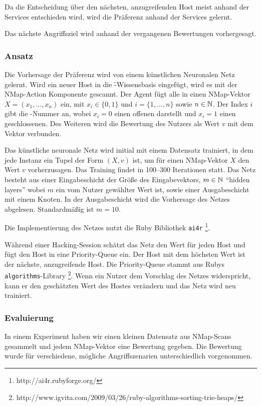 Da die Entscheidung über den nächsten, anzugreifenden Host meist
anhand der Services entschieden wird, wird die Präferenz anhand der
Services gelernt.
	
Das nächste Angriffsziel wird anhand der vergangenen Bewertungen
vorhergesagt.
	
\subsubsection{Ansatz}

Die Vorhersage der Präferenz wird von einem künstlichen Neuronalen
Netz gelernt. Wird ein neuer Host in die \f-Wissensbasis
eingefügt, wird es mit der NMap-Action Komponente gescannt. Der Agent
fügt alle  in einen NMap-Vektor $X=(x_1,\ldots,x_n)$ ein, mit
$x_i\in\{0,1\}$ und $i=\{1,\ldots,n\}$ sowie $n\in\mathbb{N}$. Der
Index $i$ gibt die -Nummer an, wobei $x_i=0$ einen offenen 
 darstellt und $x_i=1$ einen geschlossenen. Des Weiteren wird die
Bewertung des Nutzers als Wert $v$ mit dem Vektor verbunden.

Das künstliche neuronale Netz wird initial mit einem Datensatz
trainiert, in dem jede Instanz ein Tupel der Form $(X,v)$ ist, um für
einen NMap-Vektor $X$ den Wert $v$ vorherzusagen. Das Training
findet in 100--300 Iterationen statt. Das Netz besteht aus einer
Eingabeschicht der Größe des Eingabevektors, $m\in\mathbb{N}$
\enquote{hidden layers} wobei $m$ ein vom Nutzer gewählter Wert ist, sowie
einer Ausgabeschicht mit einem Knoten. In der Ausgabeschicht wird die
Vorhersage des Netzes abgelesen. Standardmäßig ist $m=10$.

Die Implementierung des Netzes nutzt die Ruby Bibliothek
\texttt{ai4r} \footnote{http://ai4r.rubyforge.org/}.

Während einer Hacking-Session schätzt das Netz den Wert für jeden Host
und fügt den Host in eine Priority-Queue ein. Der Host mit dem
höchsten Wert ist der nächste, anzugreifende Host. Die Priority-Queue
stammt aus Rubys \texttt{algorithms}-Library%
\footnote{http://www.igvita.com/2009/03/26/ruby-algorithms-sorting-trie-heaps/}.
Wenn ein Nutzer dem Vorschlag des Netzes widerspricht,
kann er den geschätzten Wert des Hostes verändern und das Netz wird
neu trainiert.

\subsubsection{Evaluierung}

In einem Experiment haben wir einen kleinen Datensatz aus NMap-Scans
gesammelt und jedem NMap-Vektor eine Bewertung gegeben. Die Bewertung
wurde für verschiedene, mögliche Angriffszenarien unterschiedlich
vorgenommen.

